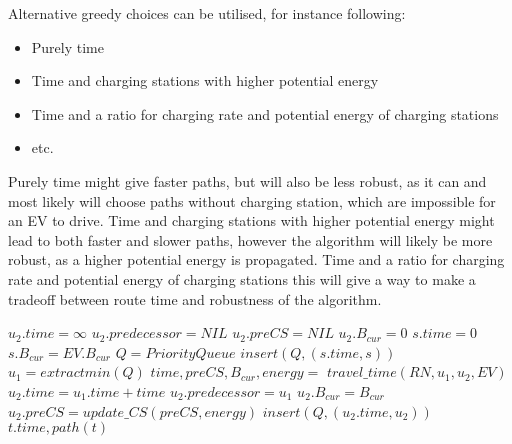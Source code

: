 Alternative greedy choices can be utilised, for instance following: 
\begin{itemize}
\item Purely time
\item Time and charging stations with higher potential energy
\item Time and a ratio for charging rate and potential energy of charging stations
\item etc. 
\end{itemize}
Purely time might give faster paths, but will also be less robust, as it can and most likely will choose paths without charging station, which are impossible for an EV to drive. Time and charging stations with higher potential energy might lead to both faster and slower paths, however the algorithm will likely be more robust, as a higher potential energy is propagated. Time and a ratio for charging rate and potential energy of charging stations this will give a way to make a tradeoff between route time and robustness of the algorithm.  

\begin{algorithm}[!htb]
\begin{algorithmic}[1]
        \State $u_2.time = \infty$
        \State $u_2.predecessor = NIL$
        \State $u_2.preCS = NIL$
        \State $u_2.B_{cur} = 0$
    \EndFor
    \State $s.time = 0$
    \State $s.B_{cur} = EV.B_{cur}$
    \State $Q = PriorityQueue$
    \State $insert(Q, (s.time, s))$ 
        \State $u_1 = extractmin(Q)$
            \State $time,preCS,B_{cur},energy = $
            \State $travel\_time(RN, u_1, u_2, EV)$
                \State $u_2.time = u_1.time + time$
                \State $u_2.predecessor = u_1$
                \State $u_2.B_{cur} = B_{cur}$
                \State $u_2.preCS = update\_CS(preCS, energy)$
                \State $insert(Q, (u_2.time, u_2))$ 
            \EndIf
        \EndFor
    \EndWhile
    \State \Return $t.time, path(t)$
\EndFunction
\end{algorithmic}\label{alg:fastest_path}
\end{algorithm}

